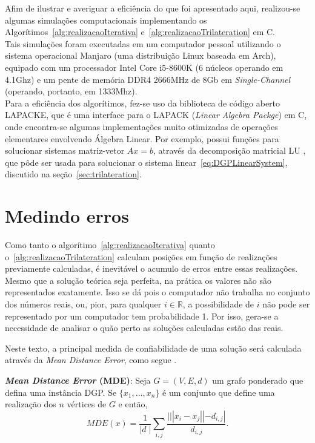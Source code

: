 \documentclass[a4paper,12pt]{report}
\begin{document}
	Afim de ilustrar e averiguar a eficiência do que foi apresentado aqui, realizou-se algumas simulações computacionais implementando os Algorítimos~\ref{alg:realizacaoIterativa} e~\ref{alg:realizacaoTrilateration} em C. 
	\\
	
	Tais simulações foram executadas em um computador pessoal utilizando o sistema operacional Manjaro (uma distribuição Linux baseada em Arch), equipado com um processador Intel Core i5-8600K (6 núcleos operando em 4.1Ghz) e um pente de memória DDR4 2666MHz de 8Gb em \textit{Single-Channel} (operando, portanto, em 1333Mhz).	
	\\
	
	Para a eficiência dos algorítimos, fez-se uso da biblioteca de código aberto LAPACKE, que é uma interface para o LAPACK (\textit{Linear Algebra Packge}) em C, onde encontra-se algumas implementações muito otimizadas de operações elementares envolvendo Álgebra Linear. Por exemplo, possui funções para solucionar sistemas matriz-vetor $Ax = b$, através da decomposição matricial LU \cite{AlgebraLinearElon}, que pôde ser usada para solucionar o sistema linear~\ref{eq:DGPLinearSystem}, discutido na seção~\ref{sec:trilateration}.
	
	\section{Medindo erros}%
	
	Como tanto o algorítimo~\ref{alg:realizacaoIterativa} quanto o~\ref{alg:realizacaoTrilateration} calculam posições em função de realizações previamente calculadas, é inevitável o acumulo de erros entre essas realizações. Mesmo que a solução teórica seja perfeita, na prática os valores não são representados exatamente. Isso se dá pois o computador não trabalha no conjunto dos números reais, ou, pior, para qualquer $i \in\mathbb{R}$, a possibilidade de $i$ não pode ser representado por um computador tem probabilidade 1. Por isso, gera-se a necessidade de analisar o quão perto as soluções calculadas estão das reais.
	
	Neste texto, a principal medida de confiabilidade de uma solução será calculada através da \textit{Mean Distance Error}, como segue \cite{mucherino:BP}.
	
	\begin{center}
		\begin{minipage}{0.9 \linewidth}
			\textbf{\textit{Mean Distance Error} (MDE)}: Seja $G= (V,E,d)$ um grafo ponderado que defina uma instância DGP. Se $\{x_1, \dots, x_n\}$ é um conjunto que define uma realização dos $n$ vértices de $G$ e então,
			$$MDE(x) = \frac{1}{|d\;|} \sum_{i,j}^{}\frac{|||x_i - x_j|| - d_{i,j}|}{d_{i,j}} .$$
		\end{minipage}
	\end{center}
	
\end{document}
